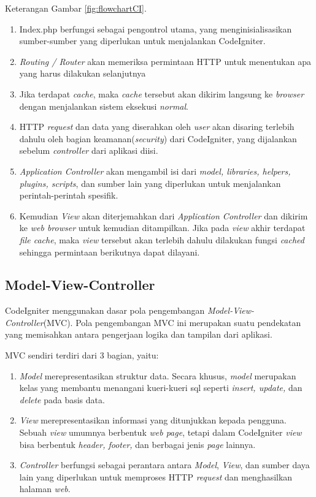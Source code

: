 Keterangan Gambar \ref{fig:flowchartCI}.
\begin{enumerate}
	\item Index.php berfungsi sebagai pengontrol utama, yang menginisialisasikan sumber-sumber yang diperlukan untuk menjalankan CodeIgniter.
	\item \textit{Routing / Router} akan memeriksa permintaan HTTP untuk menentukan apa yang harus dilakukan selanjutnya
	\item Jika terdapat \textit{cache}, maka \textit{cache} tersebut akan dikirim langsung ke \textit{browser} dengan menjalankan sistem eksekusi \textit{normal}.
	\item  HTTP \textit{request} dan data yang diserahkan oleh \textit{user} akan disaring terlebih dahulu oleh bagian keamanan(\textit{security}) dari CodeIgniter, yang dijalankan sebelum \textit{controller} dari aplikasi diisi.
	\item \textit{Application Controller} akan mengambil isi dari \textit{model, libraries, helpers, plugins, scripts}, dan sumber lain yang diperlukan untuk menjalankan perintah-perintah spesifik.
	\item Kemudian \textit{View} akan diterjemahkan dari \textit{Application Controller} dan dikirim ke \textit{web browser} untuk kemudian ditampilkan. Jika pada \textit{view} akhir terdapat \textit{file cache}, maka \textit{view} tersebut akan terlebih dahulu dilakukan fungsi \textit{cached} sehingga permintaan berikutnya dapat dilayani.
\end{enumerate}

\subsection{Model-View-Controller}
\label{sub: MVC}

CodeIgniter menggunakan dasar pola pengembangan \textit{Model-View-Controller}(MVC). Pola pengembangan MVC ini merupakan suatu pendekatan yang memisahkan antara pengerjaan logika dan tampilan dari aplikasi.

MVC sendiri terdiri dari 3 bagian, yaitu:
\begin{enumerate}
	\item \textit{Model} merepresentasikan struktur data. Secara khusus, \textit{model} merupakan kelas yang membantu menangani kueri-kueri sql seperti \textit{insert, update,} dan \textit{delete} pada basis data.
	\item \textit{View} merepresentasikan informasi yang ditunjukkan kepada pengguna. Sebuah \textit{view} umumnya berbentuk \textit{web page}, tetapi dalam CodeIgniter \textit{view} bisa berbentuk \textit{header, footer,} dan berbagai jenis \textit{page} lainnya.
	\item \textit{Controller} berfungsi sebagai perantara antara \textit{Model}, \textit{View}, dan sumber daya lain yang diperlukan untuk memproses HTTP \textit{request} dan menghasilkan halaman \textit{web}.
\end{enumerate}

